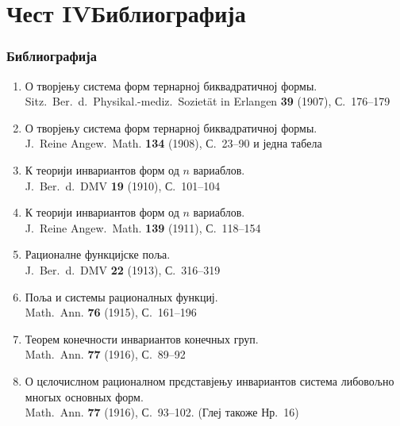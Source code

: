 \documentclass[11pt]{article}
\newcommand{\foreign}[1]{#1}
\begin{document}
\part*{Чест IV\hspace{1em}Библиографија}

\section*{Библиографија}

\begin{enumerate}[label={\small\arabic*.},leftmargin=2em,itemsep=0.3em]
\item О творјењу система форм тернарној биквадратичној формы.\\
\foreign{Sitz.\ Ber.\ d.\ Physikal.-mediz.\ Sozietät in Erlangen} \textbf{39} (1907), С.~176--179

\item О творјењу система форм тернарној биквадратичној формы.\\
\foreign{J.\ Reine Angew.\ Math.} \textbf{134} (1908), С.~23--90 и једна табела

\item К теорији инвариантов форм од $n$ вариаблов.\\
\foreign{J.\ Ber.\ d.\ DMV} \textbf{19} (1910), С.~101--104

\item К теорији инвариантов форм од $n$ вариаблов.\\
\foreign{J.\ Reine Angew.\ Math.} \textbf{139} (1911), С.~118--154

\item Рационалне функцијске поља.\\
\foreign{J.\ Ber.\ d.\ DMV} \textbf{22} (1913), С.~316--319

\item Поља и системы рационалных функциј.\\
\foreign{Math.\ Ann.} \textbf{76} (1915), С.~161--196

\item Теорем конечности инвариантов конечных груп.\\
\foreign{Math.\ Ann.} \textbf{77} (1916), С.~89--92

\item О цєлочислном рационалном прєдставјењу инвариантов система либовољно многых основных форм.\\
\foreign{Math.\ Ann.} \textbf{77} (1916), С.~93--102. (Глеј такоже Нр.~16)


\end{enumerate}
\end{document}
